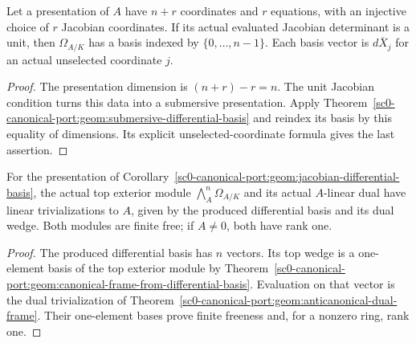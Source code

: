 \begin{corollary}
\label{sc0-canonical-port:geom:jacobian-differential-basis}
\leanok
Let a presentation of \(A\) have \(n+r\) coordinates and
\(r\) equations, with an injective choice of \(r\) Jacobian
coordinates. If its actual evaluated Jacobian determinant is a
unit, then \(\Omega_{A/K}\) has a basis indexed by
\(\{0,\ldots,n-1\}\). Each basis vector is
\(d\overline X_j\) for an actual unselected coordinate \(j\).
\end{corollary}
\begin{proof}
The presentation dimension is \((n+r)-r=n\). The unit
Jacobian condition turns this data into a submersive presentation.
Apply Theorem~\ref{sc0-canonical-port:geom:submersive-differential-basis} and
reindex its basis by this equality of dimensions. Its explicit
unselected-coordinate formula gives the last assertion.
\end{proof}

\begin{corollary}
\label{sc0-canonical-port:geom:jacobian-canonical-frames}
\leanok
For the presentation of Corollary~\ref{sc0-canonical-port:geom:jacobian-differential-basis},
the actual top exterior module
\(\bigwedge_A^n\Omega_{A/K}\) and its actual \(A\)-linear
dual have linear trivializations to \(A\), given by the produced
differential basis and its dual wedge. Both modules are finite
free; if \(A\ne0\), both have rank one.
\end{corollary}
\begin{proof}
The produced differential basis has \(n\) vectors. Its top
wedge is a one-element basis of the top exterior module by
Theorem~\ref{sc0-canonical-port:geom:canonical-frame-from-differential-basis}.
Evaluation on that vector is the dual trivialization of
Theorem~\ref{sc0-canonical-port:geom:anticanonical-dual-frame}. Their one-element
bases prove finite freeness and, for a nonzero ring, rank one.
\end{proof}

